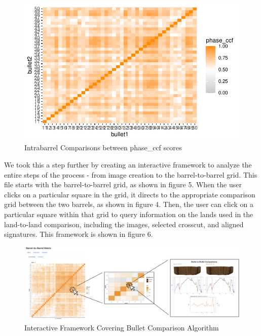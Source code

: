 \documentclass[
  number]{elsarticle}
\begin{document}
\begin{figure}[H]

{\centering \includegraphics{Interactive-Visualization-Framework_files/figure-pdf/unnamed-chunk-2-1.pdf}

}

\caption{Intrabarrel Comparisons between phase\_ccf scores}

\end{figure}

We took this a step further by creating an interactive framework to
analyze the entire steps of the process - from image creation to the
barrel-to-barrel grid. This file starts with the barrel-to-barrel grid,
as shown in figure 5. When the user clicks on a particular square in the
grid, it directs to the appropriate comparison grid between the two
barrels, as shown in figure 4. Then, the user can click on a particular
square within that grid to query information on the lands used in the
land-to-land comparison, including the images, selected crosscut, and
aligned signatures. This framework is shown in figure 6.

\begin{figure}[H]

{\centering \includegraphics{../figure/overview.png}

}

\caption{Interactive Framework Covering Bullet Comparison Algorithm}

\end{figure}
\end{document}
